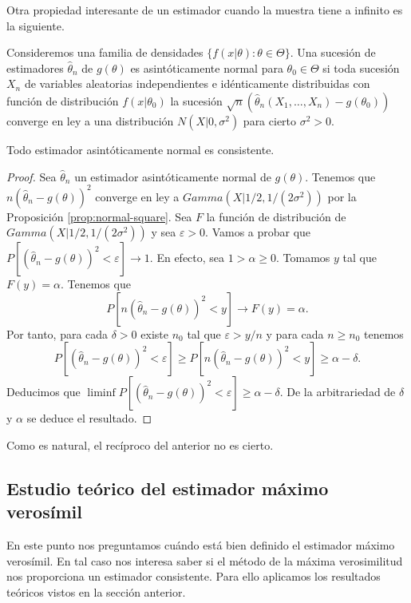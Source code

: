     Otra propiedad interesante de un estimador cuando la muestra tiene a infinito es la siguiente.

    \begin{definition}
        Consideremos una familia de densidades $\{f(x | \theta) : \theta \in \Theta\}$. Una sucesión de estimadores $\hat\theta_n$ de $g(\theta)$ es asintóticamente normal para $\theta_0 \in \Theta$ si toda sucesión $X_n$ de variables aleatorias independientes e idénticamente distribuidas con función de distribución $f(x | \theta_0)$ la sucesión $\sqrt{n}(\hat\theta_n(X_1, \ldots, X_n) - g(\theta_0))$ converge en ley a una distribución $N(X|0,\sigma^2)$ para cierto $\sigma^2 > 0$.
    \end{definition}

    \begin{prop}
        Todo estimador asintóticamente normal es consistente.
    \end{prop}
    \begin{proof}
        Sea $\hat\theta_n$ un estimador asintóticamente normal de $g(\theta)$. Tenemos que $n (\hat\theta_n - g(\theta))^2$ converge en ley a $Gamma(X|1/2, 1/(2\sigma^2))$ por la Proposición \ref{prop:normal-square}. Sea $F$ la función de distribución de $Gamma(X|1/2, 1/(2\sigma^2))$ y sea $\varepsilon > 0$. Vamos a probar que $P[(\hat\theta_n - g(\theta))^2 < \varepsilon] \to 1$. En efecto, sea $1 > \alpha \ge 0$. Tomamos $y$ tal que $F(y) = \alpha$. Tenemos que
        \[P[n(\hat\theta_n - g(\theta))^2 < y] \to F(y) = \alpha.\]
        Por tanto, para cada $\delta > 0$ existe $n_0$ tal que $\varepsilon > y /n$ y para cada $n \ge n_0$ tenemos
        \[P[(\hat\theta_n - g(\theta))^2 < \varepsilon] \ge P[n(\hat\theta_n - g(\theta))^2 < y] \ge \alpha - \delta.\]
        Deducimos que $\liminf P[(\hat\theta_n - g(\theta))^2 < \varepsilon] \ge \alpha - \delta.$ De la arbitrariedad de $\delta$ y $\alpha$ se deduce el resultado.
    \end{proof}

    Como es natural, el recíproco del anterior no es cierto.

    \subsection{Estudio teórico del estimador máximo verosímil}

    En este punto nos preguntamos cuándo está bien definido el estimador máximo verosímil. En tal caso nos interesa saber si el método de la máxima verosimilitud nos proporciona un estimador consistente. Para ello aplicamos los resultados teóricos vistos en la sección anterior.

